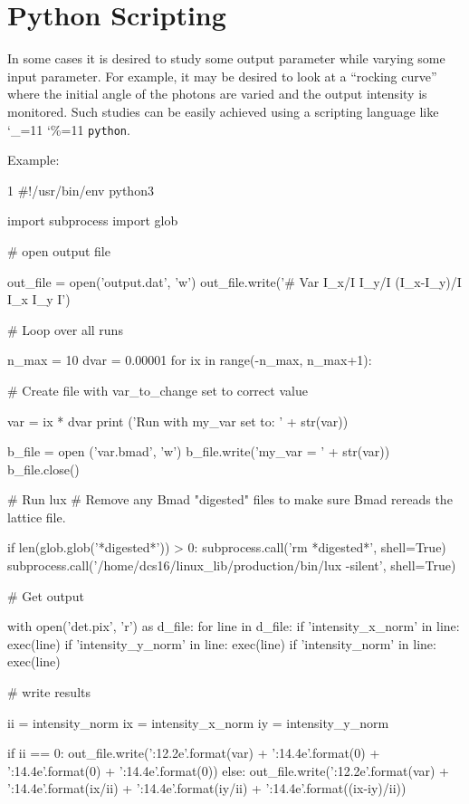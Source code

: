 \documentclass[11pt]{article}
\newcommand\ttcmd{\begingroup\catcode`\_=11 \catcode`\%=11 \dottcmd}  %
\newcommand\dottcmd[1]{\texttt{#1}\endgroup}
\newcommand{\vn}{\ttcmd}
\begin{document}
{{{{{{{{{{{{{{{{%
\section{Python Scripting}
\label{s:python}

In some cases it is desired to study some output parameter while varying some input parameter. For
example, it may be desired to look at a ``rocking curve'' where the initial angle of the photons are
varied and the output intensity is monitored.  Such studies can be easily achieved using a scripting
language like \vn{python}.

Example:
\begin{listing}{1}
#!/usr/bin/env python3

import subprocess
import glob

# open output file

out_file = open('output.dat', 'w')
out_file.write('#       Var         I_x/I         I_y/I   (I_x-I_y)/I           I_x           I_y             I\n')

# Loop over all runs

n_max = 10
dvar = 0.00001
for ix in range(-n_max, n_max+1):

  # Create file with var_to_change set to correct value

  var = ix * dvar
  print ('Run with my_var set to: ' + str(var))

  b_file = open ('var.bmad', 'w')
  b_file.write('my_var = ' + str(var))
  b_file.close()

  # Run lux
  # Remove any Bmad "digested" files to make sure Bmad rereads the lattice file.

  if len(glob.glob('*digested*')) > 0: subprocess.call('rm *digested*', shell=True)
  subprocess.call('/home/dcs16/linux_lib/production/bin/lux -silent', shell=True)

  # Get output

  with open('det.pix', 'r') as d_file:
    for line in d_file:
      if 'intensity_x_norm' in line: exec(line)
      if 'intensity_y_norm' in line: exec(line)
      if 'intensity_norm' in line: exec(line)

  # write results

  ii = intensity_norm
  ix = intensity_x_norm
  iy = intensity_y_norm

  if ii == 0:
    out_file.write('{:12.2e}'.format(var) + '{:14.4e}'.format(0) + 
                   '{:14.4e}'.format(0) + '{:14.4e}'.format(0))
  else:
    out_file.write('{:12.2e}'.format(var) + '{:14.4e}'.format(ix/ii) + 
                   '{:14.4e}'.format(iy/ii) + '{:14.4e}'.format((ix-iy)/ii))


\end{listing}}}}}}}}}}}}}}}}}
\end{document}
